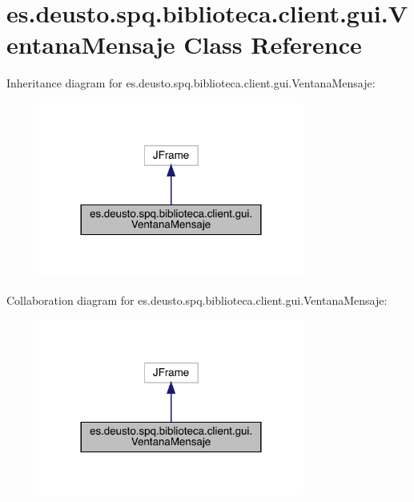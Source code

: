 \hypertarget{classes_1_1deusto_1_1spq_1_1biblioteca_1_1client_1_1gui_1_1_ventana_mensaje}{}\section{es.\+deusto.\+spq.\+biblioteca.\+client.\+gui.\+Ventana\+Mensaje Class Reference}
\label{classes_1_1deusto_1_1spq_1_1biblioteca_1_1client_1_1gui_1_1_ventana_mensaje}


Inheritance diagram for es.\+deusto.\+spq.\+biblioteca.\+client.\+gui.\+Ventana\+Mensaje\+:
\nopagebreak
\begin{figure}[H]
\begin{center}
\leavevmode
\includegraphics[width=248pt]{classes_1_1deusto_1_1spq_1_1biblioteca_1_1client_1_1gui_1_1_ventana_mensaje__inherit__graph}
\end{center}
\end{figure}


Collaboration diagram for es.\+deusto.\+spq.\+biblioteca.\+client.\+gui.\+Ventana\+Mensaje\+:
\nopagebreak
\begin{figure}[H]
\begin{center}
\leavevmode
\includegraphics[width=248pt]{classes_1_1deusto_1_1spq_1_1biblioteca_1_1client_1_1gui_1_1_ventana_mensaje__coll__graph}
\end{center}
\end{figure}
